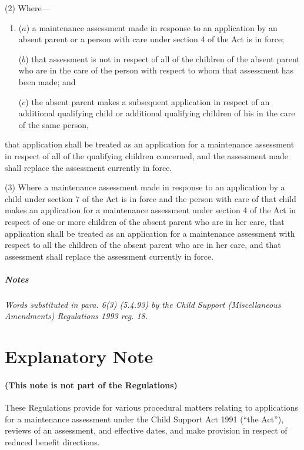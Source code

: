 \documentclass[a4paper]{article}
\newcommand{\parthead}{}
\newcommand\amendment[1]{\subsubsection*{Notes}{\itshape\frenchspacing\footnotesize #1 \par}}
\begin{document}
(2) Where—
\begin{enumerate}\item[]
($a$) a maintenance assessment made in response to an application by an absent parent or a person with care under section 4 of the Act is in force;

($b$) that assessment is not in respect of all of the children of the absent parent who are in the care of the person with respect to whom that assessment has been made; and

($c$) the absent parent makes a subsequent application in respect of an additional qualifying child or additional qualifying children of his in the care of the same person,
\end{enumerate}
that application shall be treated as an application for a maintenance assessment in respect of all of the qualifying children concerned, and the assessment made shall replace the assessment currently in force.

(3) Where a maintenance assessment made in response to an application by a child under section 7 of the Act is in force and the person with care of that child makes an application for a maintenance assessment under section 4 of the Act in respect of 
one or more children of the absent parent who are in her care, that application shall be treated as an application for a maintenance assessment with respect to all the children of the absent parent who are in her care, and %
that assessment shall replace the assessment currently in force.

\amendment{
Words substituted in para. 6(3) (5.4.93) by the Child Support (Miscellaneous Amendments) Regulations 1993 reg. 18.
}

\part{Explanatory Note}

\renewcommand\parthead{--- Explanatory Note}

\subsection*{(This note is not part of the Regulations)}

 These Regulations provide for various procedural matters relating to applications for a maintenance assessment under the Child Support Act 1991 (“the Act”), reviews of an assessment, and effective dates, and make provision in respect of reduced benefit directions.
\end{document}

